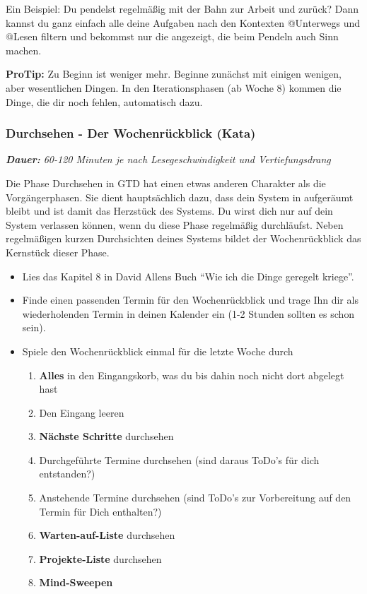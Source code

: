 \documentclass[
  ngerman,
  paper=a4,
,captions=tableheading
]{scrartcl}
\providecommand{\tightlist}{%
  \setlength{\itemsep}{0pt}\setlength{\parskip}{0pt}}
\begin{document}
Ein Beispiel: Du pendelst regelmäßig mit der Bahn zur Arbeit und zurück?
Dann kannst du ganz einfach alle deine Aufgaben nach den Kontexten
@Unterwegs und @Lesen filtern und bekommst nur die angezeigt, die beim
Pendeln auch Sinn machen.

\textbf{ProTip:} Zu Beginn ist weniger mehr. Beginne zunächst mit
einigen wenigen, aber wesentlichen Dingen. In den Iterationsphasen (ab
Woche 8) kommen die Dinge, die dir noch fehlen, automatisch dazu.

\hypertarget{durchsehen---der-wochenruxfcckblick-kata}{%
\subsubsection{Durchsehen - Der Wochenrückblick
(Kata)}\label{durchsehen---der-wochenruxfcckblick-kata}}

\emph{\textbf{Dauer:} 60-120 Minuten je nach Lesegeschwindigkeit und
Vertiefungsdrang}

Die Phase Durchsehen in GTD hat einen etwas anderen Charakter als die
Vorgängerphasen. Sie dient hauptsächlich dazu, dass dein System in
aufgeräumt bleibt und ist damit das Herzstück des Systems. Du wirst dich
nur auf dein System verlassen können, wenn du diese Phase regelmäßig
durchläufst. Neben regelmäßigen kurzen Durchsichten deines Systems
bildet der Wochenrückblick das Kernstück dieser Phase.

\begin{itemize}
\tightlist
\item
  Lies das Kapitel 8 in David Allens Buch ``Wie ich die Dinge geregelt
  kriege''.
\item
  Finde einen passenden Termin für den Wochenrückblick und trage Ihn dir
  als wiederholenden Termin in deinen Kalender ein (1-2 Stunden sollten
  es schon sein).
\item
  Spiele den Wochenrückblick einmal für die letzte Woche durch

  \begin{enumerate}
  \def\labelenumi{\arabic{enumi}.}
  \tightlist
  \item
    \textbf{Alles} in den Eingangskorb, was du bis dahin noch nicht dort
    abgelegt hast
  \item
    Den Eingang leeren
  \item
    \textbf{Nächste Schritte} durchsehen
  \item
    Durchgeführte Termine durchsehen (sind daraus ToDo's für dich
    entstanden?)
  \item
    Anstehende Termine durchsehen (sind ToDo's zur Vorbereitung auf den
    Termin für Dich enthalten?)
  \item
    \textbf{Warten-auf-Liste} durchsehen
  \item
    \textbf{Projekte-Liste} durchsehen
  \item
    \textbf{Mind-Sweepen}
  \end{enumerate}
\end{itemize}
\end{document}

